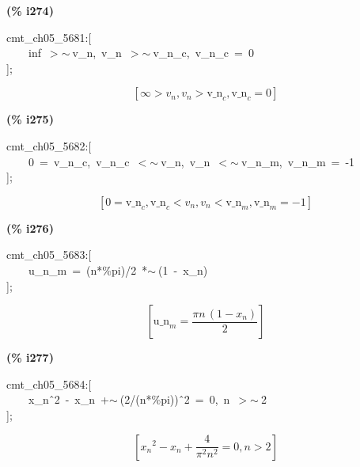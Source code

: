 \documentclass[fleqn]{article}
\begin{document}
\noindent
\begin{minipage}[t]{4.000000em}\color{red}\bfseries
(\% i274)	
\end{minipage}
\begin{minipage}[t]{\textwidth}\color{blue}
cmt\_ch05\_5681:[\\
\ \ \ \ inf\ \ensuremath{>}\ensuremath{\sim\ }v\_n,\ v\_n\ \ensuremath{>}\ensuremath{\sim\ }v\_n\_c,\ v\_n\_c\ =\ 0\\
];
\end{minipage}
\[\displaystyle \tag{\% o274} 
\left[ \infty \operatorname{>  }{v_n}\operatorname{,}{v_n}\operatorname{>  }{{\ensuremath{\mathrm{v\_ n}}}_c}\operatorname{,}{{\ensuremath{\mathrm{v\_ n}}}_c}=0\right] \mbox{}
\]


\noindent
\begin{minipage}[t]{4.000000em}\color{red}\bfseries
(\% i275)	
\end{minipage}
\begin{minipage}[t]{\textwidth}\color{blue}
cmt\_ch05\_5682:[\\
\ \ \ \ 0\ =\ v\_n\_c,\ v\_n\_c\ \ensuremath{<}\ensuremath{\sim\ }v\_n,\ v\_n\ \ensuremath{<}\ensuremath{\sim\ }v\_n\_m,\ v\_n\_m\ =\ -1\\
];
\end{minipage}
\[\displaystyle \tag{\% o275} 
\left[ 0={{\ensuremath{\mathrm{v\_ n}}}_c}\operatorname{,}{{\ensuremath{\mathrm{v\_ n}}}_c}\operatorname{<  }{v_n}\operatorname{,}{v_n}\operatorname{<  }{{\ensuremath{\mathrm{v\_ n}}}_m}\operatorname{,}{{\ensuremath{\mathrm{v\_ n}}}_m}=-1\right] \mbox{}
\]


\noindent
\begin{minipage}[t]{4.000000em}\color{red}\bfseries
(\% i276)	
\end{minipage}
\begin{minipage}[t]{\textwidth}\color{blue}
cmt\_ch05\_5683:[\\
\ \ \ \ u\_n\_m\ =\ (n*\%pi)/2\ *\ensuremath{\sim\ }(1\ -\ x\_n)\ \ \ \ \\
];
\end{minipage}
\[\displaystyle \tag{\% o276} 
\left[ {{\ensuremath{\mathrm{u\_ n}}}_m}=\frac{\ensuremath{\pi}  n\, \left( 1-{x_n}\right) }{2}\right] \mbox{}
\]


\noindent
\begin{minipage}[t]{4.000000em}\color{red}\bfseries
(\% i277)	
\end{minipage}
\begin{minipage}[t]{\textwidth}\color{blue}
cmt\_ch05\_5684:[\\
\ \ \ \ x\_n\^\ 2\ -\ x\_n\ +\ensuremath{\sim\ }(2/(n*\%pi))\^\ 2\ =\ 0,\ n\ \ensuremath{>}\ensuremath{\sim\ }2\\
];
\end{minipage}
\[\displaystyle \tag{\% o277} 
\left[ {{{x_n}}^{2}}-{x_n}+\frac{4}{{{\ensuremath{\pi} }^{2}} {{n}^{2}}}=0\operatorname{,}n\operatorname{>  }2\right] \mbox{}
\]
\end{document}
